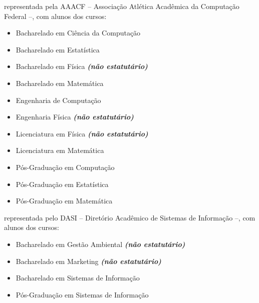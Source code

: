 \begin{article}
\begin{description}[noitemsep]
		\item[UFSCar] representada pela AAACF -- Associação Atlética Acadêmica da Computação Federal --, com alunos dos cursos:
		\begin{itemize}[noitemsep]
			\item Bacharelado em Ciência da Computação
			\item Bacharelado em Estatística
			\item Bacharelado em Física \textbf{\textit{(não estatutário)}}
			\item Bacharelado em Matemática
			\item Engenharia de Computação
			\item Engenharia Física \textbf{\textit{(não estatutário)}}
			\item Licenciatura em Física \textbf{\textit{(não estatutário)}}
			\item Licenciatura em Matemática
			\item Pós-Graduação em Computação
			\item Pós-Graduação em Estatística
			\item Pós-Graduação em Matemática
		\end{itemize}

		\item[USP Leste - EACH] representada pelo DASI -- Diretório Acadêmico de Sistemas de Informação --, com alunos dos cursos:
		\begin{itemize}[noitemsep]
			\item Bacharelado em Gestão Ambiental \textbf{\textit{(não estatutário)}}
			\item Bacharelado em Marketing \textbf{\textit{(não estatutário)}}
			\item Bacharelado em Sistemas de Informação
			\item Pós-Graduação em Sistemas de Informação
		\end{itemize}


\end{description}
\end{article}
